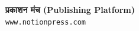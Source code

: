 \documentclass{article}
\begin{document}
\begin{center}
\textbf{प्रकाशन मंच (Publishing Platform) }\\
\texttt{www.notionpress.com}\\
\end{center}

\end{document}
